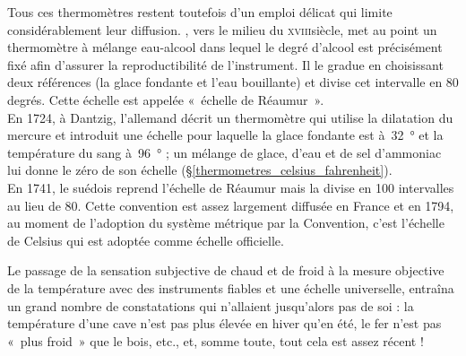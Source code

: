 	Tous ces thermomètres restent toutefois d'un emploi délicat qui limite considérablement leur diffusion. , vers le milieu du \textsc{xviii}\ieme siècle, met au point un thermomètre à mélange eau-alcool dans lequel le degré d'alcool est précisément fixé afin d'assurer la reproductibilité de l'instrument. Il le gradue en choisissant deux références (la glace fondante et l'eau bouillante) et divise cet intervalle en 80 degrés. Cette échelle est appelée «~échelle de Réaumur~».\\	
	En 1724, à Dantzig, l’allemand  décrit un thermomètre qui utilise la dilatation du mercure et introduit une échelle pour laquelle la glace fondante est à~\SI{32}{\degree} et la température du sang à~\SI{96}{\degree} ; un mélange de glace, d'eau et de sel d'ammoniac lui donne le zéro de son échelle (\S\ref{thermometres_celsius_fahrenheit}).\\	
	En 1741, le suédois  reprend l'échelle de Réaumur mais la divise en 100 intervalles au lieu de 80. Cette convention est assez largement diffusée en France et en 1794, au moment de l'adoption du système métrique par la Convention, c'est l'échelle de Celsius qui est adoptée comme échelle officielle.

	Le passage de la sensation subjective de chaud et de froid à la mesure objective de la température avec des instruments fiables et une échelle universelle, entraîna un grand nombre de constatations qui n'allaient jusqu'alors pas de soi : la température d'une cave n'est pas plus élevée en hiver qu'en été, le fer n'est pas «~plus froid~» que le bois, etc., et, somme toute, tout cela est assez récent !

\atendofhistorysection
